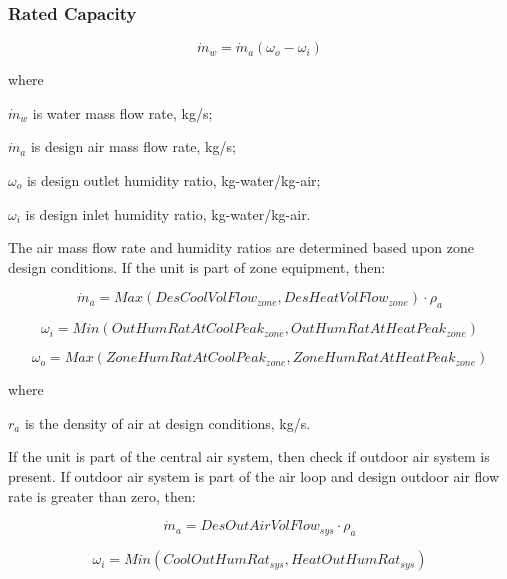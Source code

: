 \subsubsection{Rated Capacity}\label{rated-capacity}

\begin{equation}
{\dot m_w} = {\dot m_a}\left( {{\omega_o} - {\omega_i}} \right)
\end{equation}

where

\({\dot m_w}\) is water mass flow rate, kg/s;

\({\dot m_a}\) is design air mass flow rate, kg/s;

\(\omega_{o}\) is design outlet humidity ratio, kg-water/kg-air;

\(\omega_{i}\) is design inlet humidity ratio, kg-water/kg-air.

The air mass flow rate and humidity ratios are determined based upon zone design conditions. If the unit is part of zone equipment, then:

\begin{equation}
{\dot m_a} = Max\left( {DesCoolVolFlo{w_{zone}},DesHeatVolFlo{w_{zone}}} \right) \cdot {\rho_a}
\end{equation}

\begin{equation}
{\omega_i} = Min\left( {OutHumRatAtCoolPea{k_{zone}},OutHumRatAtHeatPea{k_{zone}}} \right)
\end{equation}

\begin{equation}
  {\omega_o} = Max\left( {ZoneHumRatAtCoolPea{k_{zone}},ZoneHumRatAtHeatPea{k_{zone}}} \right)
\end{equation}

where

\(r_{a}\) is the density of air at design conditions, kg/s.

If the unit is part of the central air system, then check if outdoor air system is present. If outdoor air system is part of the air loop and design outdoor air flow rate is greater than zero, then:

\begin{equation}
{\dot m_a} = DesOutAirVolFlo{w_{sys}} \cdot {\rho_a}
\end{equation}

\begin{equation}
{\omega_i} = Min\left( {CoolOutHumRa{t_{sys}},HeatOutHumRa{t_{sys}}} \right)
\end{equation}


